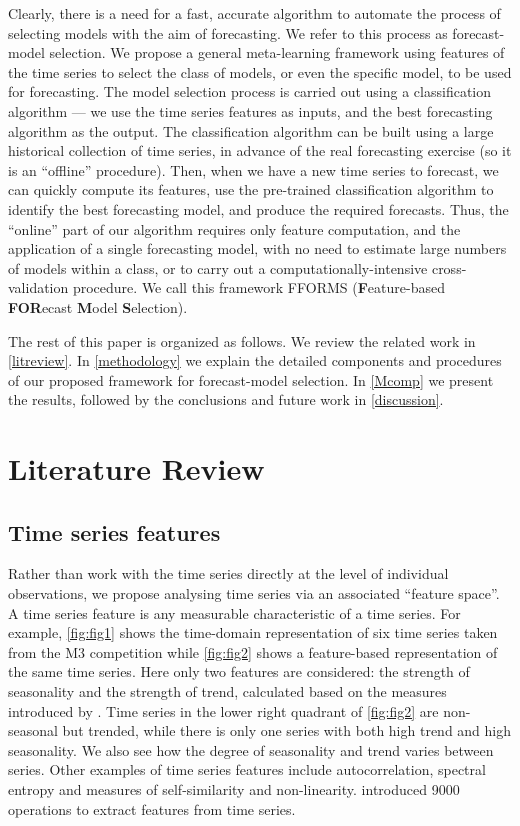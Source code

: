 \documentclass[11pt,a4paper,]{article}
\theoremstyle{definition}
\theoremstyle{definition}
\theoremstyle{definition}
\theoremstyle{remark}
\begin{document}
Clearly, there is a need for a fast, accurate algorithm to automate the
process of selecting models with the aim of forecasting. We refer to
this process as forecast-model selection. We propose a general
meta-learning framework using features of the time series to select the
class of models, or even the specific model, to be used for forecasting.
The model selection process is carried out using a classification
algorithm --- we use the time series features as inputs, and the best
forecasting algorithm as the output. The classification algorithm can be
built using a large historical collection of time series, in advance of
the real forecasting exercise (so it is an ``offline'' procedure). Then,
when we have a new time series to forecast, we can quickly compute its
features, use the pre-trained classification algorithm to identify the
best forecasting model, and produce the required forecasts. Thus, the
``online'' part of our algorithm requires only feature computation, and
the application of a single forecasting model, with no need to estimate
large numbers of models within a class, or to carry out a
computationally-intensive cross-validation procedure. We call this
framework FFORMS (\textbf{F}eature-based \textbf{FOR}ecast
\textbf{M}odel \textbf{S}election).

The rest of this paper is organized as follows. We review the related
work in \autoref{litreview}. In \autoref{methodology} we explain the
detailed components and procedures of our proposed framework for
forecast-model selection. In \autoref{Mcomp} we present the results,
followed by the conclusions and future work in \autoref{discussion}.

\section{Literature Review}\label{litreview}

\subsection{Time series features}\label{time-series-features}

Rather than work with the time series directly at the level of
individual observations, we propose analysing time series via an
associated ``feature space''. A time series feature is any measurable
characteristic of a time series. For example, \autoref{fig:fig1} shows
the time-domain representation of six time series taken from the M3
competition \autocite{makridakis2000m3} while \autoref{fig:fig2} shows a
feature-based representation of the same time series. Here only two
features are considered: the strength of seasonality and the strength of
trend, calculated based on the measures introduced by
\textcite{wang2009rule}. Time series in the lower right quadrant of
\autoref{fig:fig2} are non-seasonal but trended, while there is only one
series with both high trend and high seasonality. We also see how the
degree of seasonality and trend varies between series. Other examples of
time series features include autocorrelation, spectral entropy and
measures of self-similarity and non-linearity.
\textcite{fulcher2014highly} introduced 9000 operations to extract
features from time series.
\end{document}
